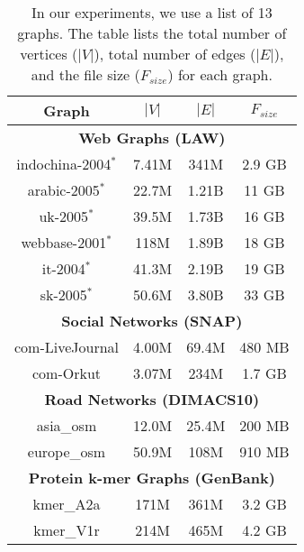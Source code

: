 \begin{table}[!ht]
  \centering
  \caption{In our experiments, we use a list of 13 graphs. The table lists the total number of vertices ($|V|$), total number of edges ($|E|$), and the file size ($F_{size}$) for each graph.}
  \label{tab:dataset}
  \begin{tabular}{|c||c|c|c|}
    \toprule
    \textbf{Graph} &
    \textbf{\textbf{$|V|$}} &
    \textbf{\textbf{$|E|$}} &
    \textbf{\textbf{$F_{size}$}} \\
    \midrule
    \multicolumn{4}{|c|}{\textbf{Web Graphs (LAW)}} \\ \hline
    indochina-2004$^*$ & 7.41M & 341M & 2.9 GB \\ \hline
    arabic-2005$^*$ & 22.7M & 1.21B & 11 GB \\ \hline
    uk-2005$^*$ & 39.5M & 1.73B & 16 GB \\ \hline
    webbase-2001$^*$ & 118M & 1.89B & 18 GB \\ \hline
    it-2004$^*$ & 41.3M & 2.19B & 19 GB \\ \hline
    sk-2005$^*$ & 50.6M & 3.80B & 33 GB \\ \hline
    \multicolumn{4}{|c|}{\textbf{Social Networks (SNAP)}} \\ \hline
    com-LiveJournal & 4.00M & 69.4M & 480 MB \\ \hline
    com-Orkut & 3.07M & 234M & 1.7 GB \\ \hline
    \multicolumn{4}{|c|}{\textbf{Road Networks (DIMACS10)}} \\ \hline
    asia\_osm & 12.0M & 25.4M & 200 MB \\ \hline
    europe\_osm & 50.9M & 108M & 910 MB \\ \hline
    \multicolumn{4}{|c|}{\textbf{Protein k-mer Graphs (GenBank)}} \\ \hline
    kmer\_A2a & 171M & 361M & 3.2 GB \\ \hline
    kmer\_V1r & 214M & 465M & 4.2 GB \\ \hline
  \bottomrule
  \end{tabular}
  \end{table}
